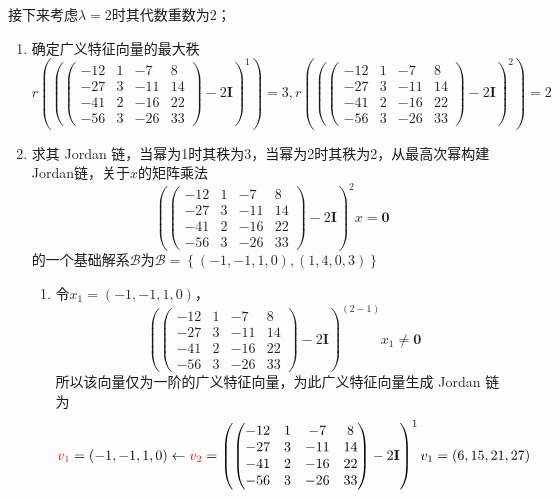 \begin{example}
接下来考虑$\lambda=2$时其代数重数为$2$；
\begin{enumerate}
	\item 确定广义特征向量的最大秩 $$r\left( \left( \begin{pmatrix}
	-12 & 1 & -7 & 8\\
	-27 & 3 & -11 & 14\\
	-41 & 2 & -16 & 22\\
	-56 & 3 & -26 & 33
	\end{pmatrix}-2\mathbf{I} \right)^1 \right)=3,r\left( \left( \begin{pmatrix}
	-12 & 1 & -7 & 8\\
	-27 & 3 & -11 & 14\\
	-41 & 2 & -16 & 22\\
	-56 & 3 & -26 & 33
	\end{pmatrix}-2\mathbf{I} \right)^2 \right)=2$$
	\item 求其 Jordan 链，当幂为1时其秩为3，当幂为2时其秩为2，从最高次幂构建Jordan链，关于$x$的矩阵乘法$$\left( \begin{pmatrix}
	-12 & 1 & -7 & 8\\
	-27 & 3 & -11 & 14\\
	-41 & 2 & -16 & 22\\
	-56 & 3 & -26 & 33
	\end{pmatrix}-2\mathbf{I} \right)^2x=\boldsymbol{0}$$的一个基础解系$\mathcal{B}$为$\mathcal{B}=\left\{ (-1,-1,1,0),(1,4,0,3) \right\}$\begin{enumerate}
		\item 令$x_1=(-1,-1,1,0)$，$$\left( \begin{pmatrix}
	-12 & 1 & -7 & 8\\
	-27 & 3 & -11 & 14\\
	-41 & 2 & -16 & 22\\
	-56 & 3 & -26 & 33
	\end{pmatrix}-2\mathbf{I} \right)^{(2-1)}x_1\neq \boldsymbol{0}$$所以该向量仅为一阶的广义特征向量，为此广义特征向量生成 Jordan 链为$$\textcolor{red}{v_1}=(-1,-1,1,0)\leftarrow \textcolor{red}{v_2}=\left( \begin{pmatrix}
	-12 & 1 & -7 & 8\\
	-27 & 3 & -11 & 14\\
	-41 & 2 & -16 & 22\\
	-56 & 3 & -26 & 33
	\end{pmatrix}-2\mathbf{I} \right)^1v_1=(6,15,21,27)$$


\end{enumerate}
\end{enumerate}
\end{example}
